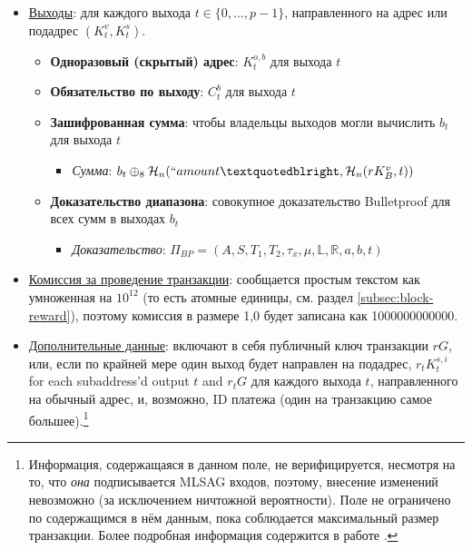 \begin{itemize}
    \item \underline{Выходы}: для каждого выхода $t \in \{0,...,p-1\}$, направленного на адрес или подадрес $(K^v_t,K^s_t)$.
    \begin{itemize}
        \item \textbf{Одноразовый (скрытый) адрес}: $K^{o,b}_t$ для выхода $t$
        \item \textbf{Обязательство по выходу}: $C^{b}_t$ для выхода $t$
        \item \textbf{Зашифрованная сумма}: чтобы владельцы выходов могли вычислить $b_t$ для выхода $t$
        \begin{itemize}
            \item \textit{Сумма}: $b_t \oplus_8 \mathcal{H}_n(``amount”, \mathcal{H}_n(r K_B^v, t))$
        \end{itemize}
        \item \textbf{Доказательство диапазона}: совокупное доказательство Bulletproof для всех сумм в выходах $b_t$
        \begin{itemize}
            \item \textit{Доказательство}: $\Pi_{BP} = (A, S, T_1, T_2, \tau_x, \mu, \mathbb{L}, \mathbb{R}, a, b, t)$
        \end{itemize}
    \end{itemize}
    \item \underline{Комиссия за проведение транзакции}: сообщается простым текстом как умноженная на $10^{12}$ (то есть атомные единицы, см. раздел \ref{subsec:block-reward}), поэтому комиссия в размере 1,0 будет записана как 1000000000000.
    \item \underline{Дополнительные данные}: включают в себя публичный ключ транзакции $r G$, или, если по крайней мере один выход будет направлен на подадрес, $r_t K^{s,i}_t$ for each subaddress'd output $t$ and $r_t G$ для каждого выхода $t$, направленного на обычный адрес, и, возможно, ID платежа (один на транзакцию самое большее).\footnote{Информация, содержащаяся в данном поле, не верифицируется, несмотря на то, что {\em она} подписывается MLSAG входов, поэтому, внесение изменений невозможно (за исключением ничтожной вероятности). Поле не ограничено по содержащимся в нём данным, пока соблюдается максимальный размер транзакции. Более подробная информация содержится в работе \cite{extra-field-stackexchange}.}
\end{itemize}

